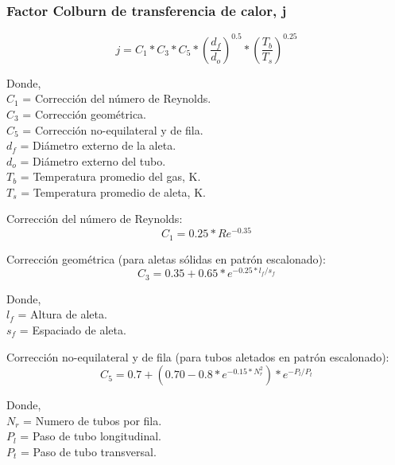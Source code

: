 \subsubsection{Factor Colburn de transferencia de calor, j}
\begin{equation*}
j = C_1 *C_3 *C_5 *(\dfrac{d_f}{d_o})^{0.5} *(\frac{T_b}{T_s})^{0.25}
\end{equation*}

\par Donde, \\
$C_1$ = Corrección del número de Reynolds. \\
$C_3$ = Corrección geométrica. \\
$C_5$ = Corrección no-equilateral y de fila. \\
$d_f$ = Diámetro externo de la aleta. \\
$d_o$ = Diámetro externo del tubo. \\
$T_b$ = Temperatura promedio del gas, K. \\
$T_s$ = Temperatura promedio de aleta, K.\\

\par Corrección del número de Reynolds:
\begin{equation*}
C_1 = 0.25 *Re^{-0.35}
\end{equation*}

\par Corrección geométrica (para aletas sólidas en patrón escalonado):
\begin{equation*}
C_3 = 0.35 +0.65 *e^{-0.25*l_f/s_f}
\end{equation*}
\par Donde, \\
$l_f$ = Altura de aleta. \\
$s_f$ = Espaciado de aleta.\\

\par Corrección no-equilateral y de fila (para tubos aletados en patrón escalonado):
\begin{equation*}
C_5 = 0.7 +(0.70 -0.8 *e^{-0.15 *N_r^2}) *e^{-P_l/P_t}
\end{equation*}
\par Donde, \\
$N_r$ = Numero de tubos por fila. \\
$P_l$ = Paso de tubo longitudinal.\\
$P_t$ = Paso de tubo transversal. \\

